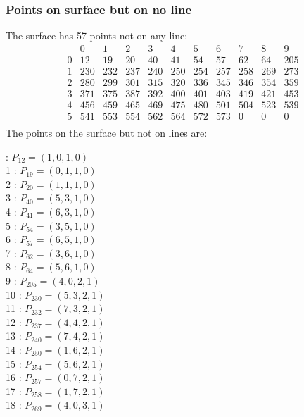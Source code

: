\documentclass{article}
\begin{document}
{\subsubsection*{Points on surface but on no line}
The surface has 57 points not on any line:\\
$$
\begin{array}{r|*{10}{r}}
 & 0 & 1 & 2 & 3 & 4 & 5 & 6 & 7 & 8 & 9\\
\hline
0 & 12 & 19 & 20 & 40 & 41 & 54 & 57 & 62 & 64 & 205\\
1 & 230 & 232 & 237 & 240 & 250 & 254 & 257 & 258 & 269 & 273\\
2 & 280 & 299 & 301 & 315 & 320 & 336 & 345 & 346 & 354 & 359\\
3 & 371 & 375 & 387 & 392 & 400 & 401 & 403 & 419 & 421 & 453\\
4 & 456 & 459 & 465 & 469 & 475 & 480 & 501 & 504 & 523 & 539\\
5 & 541 & 553 & 554 & 562 & 564 & 572 & 573 & 0 & 0 & 0\\
\end{array}
$$
The points on the surface but not on lines are:\\
\begin{multicols}{2}
 : $P_{12}=( 1, 0, 1, 0 )$\\
1 : $P_{19}=( 0, 1, 1, 0 )$\\
2 : $P_{20}=( 1, 1, 1, 0 )$\\
3 : $P_{40}=( 5, 3, 1, 0 )$\\
4 : $P_{41}=( 6, 3, 1, 0 )$\\
5 : $P_{54}=( 3, 5, 1, 0 )$\\
6 : $P_{57}=( 6, 5, 1, 0 )$\\
7 : $P_{62}=( 3, 6, 1, 0 )$\\
8 : $P_{64}=( 5, 6, 1, 0 )$\\
9 : $P_{205}=( 4, 0, 2, 1 )$\\
10 : $P_{230}=( 5, 3, 2, 1 )$\\
11 : $P_{232}=( 7, 3, 2, 1 )$\\
12 : $P_{237}=( 4, 4, 2, 1 )$\\
13 : $P_{240}=( 7, 4, 2, 1 )$\\
14 : $P_{250}=( 1, 6, 2, 1 )$\\
15 : $P_{254}=( 5, 6, 2, 1 )$\\
16 : $P_{257}=( 0, 7, 2, 1 )$\\
17 : $P_{258}=( 1, 7, 2, 1 )$\\
18 : $P_{269}=( 4, 0, 3, 1 )$\\

\end{multicols}}
\end{document}
